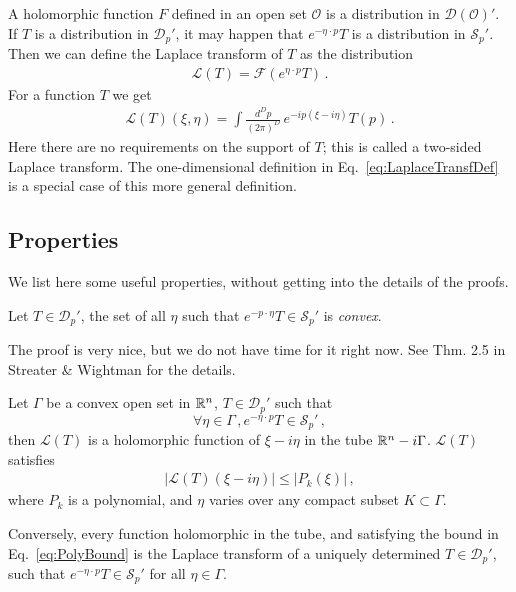 A holomorphic function $F$ defined in an open set $\mathcal{O}$ is a
distribution in $\mathcal{D}(\mathcal{O})'$. If $T$ is a distribution in
$\mathcal{D}_p'$, it may happen that $e^{-\eta \cdot p} T$ is a distribution in
$\mathcal{S}_p'$. Then we can define the Laplace transform of $T$ as the
distribution
\begin{align}
    \label{eq:LaplaceDistrDef}
    \mathcal{L}(T) = \mathcal{F}\left(e^{\eta\cdot p} T\right)\, .
\end{align}
For a function $T$ we get
\begin{align}
    \label{eq:LaplaceDistrFunc}
    \mathcal{L}(T)(\xi,\eta) = 
        \int \frac{d^Dp}{(2\pi)^D}\, e^{-i p (\xi - i \eta)} T(p)\, .
\end{align}
Here there are no requirements on the support of $T$; this is called a two-sided
Laplace transform. The one-dimensional definition in
Eq.~\eqref{eq:LaplaceTransfDef} is a special case of this more general
definition. 

\subsection{Properties}
\label{sec:LaplaceProperties}

We list here some useful properties, without getting into the details of the
proofs.

\begin{Thm}
    Let $T \in \mathcal{D}_p'$, the set of all $\eta$ such that 
    $e^{-p\cdot \eta} T \in \mathcal{S}_p'$ is {\em convex}.
\end{Thm}
The proof is very nice, but we do not have time for it right now. See Thm. 2.5
in Streater \& Wightman for the details. 

\begin{Thm}
    Let $\Gamma$ be a convex open set in $\mathbb{R}^n$, $T \in \mathcal{D}_p'$ such that
    \[
        \forall \eta \in \Gamma\, , e^{-\eta\cdot p} T \in \mathcal{S}_p'\, ,   
    \]
    then $\mathcal{L}(T)$ is a holomorphic function of $\xi-i\eta$ in the tube
    $\mathbb{R}^n - i\Gamma$. $\mathcal{L}(T)$ satisfies
    \begin{align}
        \label{eq:PolyBound}
        |\mathcal{L}(T)(\xi-i\eta)| \leq \left|P_k(\xi)\right|\, ,           
    \end{align}
    where $P_k$ is a polynomial, and $\eta$ varies over any compact 
    subset $K \subset\Gamma$.

    Conversely, every function holomorphic in the tube, and satisfying the bound
    in Eq.~\eqref{eq:PolyBound} is the Laplace transform of a uniquely
    determined $T \in \mathcal{D}_p'$, such that $e^{-\eta\cdot p} T \in
    \mathcal{S}_p'$ for all $\eta\in\Gamma$.
\end{Thm}

